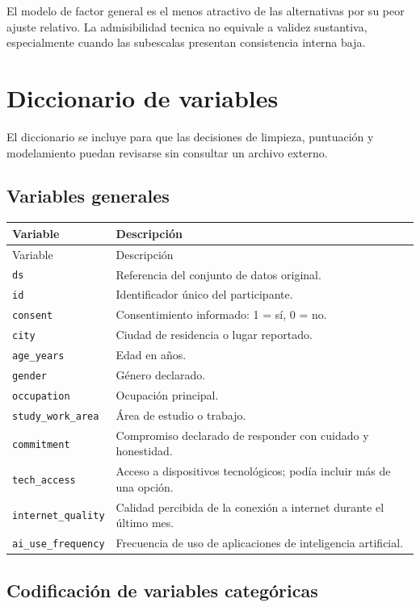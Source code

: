 \documentclass[11pt,a4paper]{article}
\begin{document}
El modelo de factor general es el menos atractivo de las alternativas por su peor ajuste relativo. La admisibilidad tecnica no equivale a validez sustantiva, especialmente cuando las subescalas presentan consistencia interna baja.

\section{Diccionario de variables}

El diccionario se incluye para que las decisiones de limpieza, puntuación y modelamiento puedan revisarse sin consultar un archivo externo.

\subsection{Variables generales}
\small
\begin{longtable}{p{}p{}}
\toprule
Variable & Descripción \\
\midrule
\endfirsthead
\toprule
Variable & Descripción \\
\midrule
\endhead
\texttt{ds} & Referencia del conjunto de datos original. \\
\texttt{id} & Identificador único del participante. \\
\texttt{consent} & Consentimiento informado: 1 = sí, 0 = no. \\
\texttt{city} & Ciudad de residencia o lugar reportado. \\
\texttt{age\_years} & Edad en años. \\
\texttt{gender} & Género declarado. \\
\texttt{occupation} & Ocupación principal. \\
\texttt{study\_work\_area} & Área de estudio o trabajo. \\
\texttt{commitment} & Compromiso declarado de responder con cuidado y honestidad. \\
\texttt{tech\_access} & Acceso a dispositivos tecnológicos; podía incluir más de una opción. \\
\texttt{internet\_quality} & Calidad percibida de la conexión a internet durante el último mes. \\
\texttt{ai\_use\_frequency} & Frecuencia de uso de aplicaciones de inteligencia artificial. \\
\bottomrule
\end{longtable}
\normalsize

\subsection{Codificación de variables categóricas}
\end{document}
